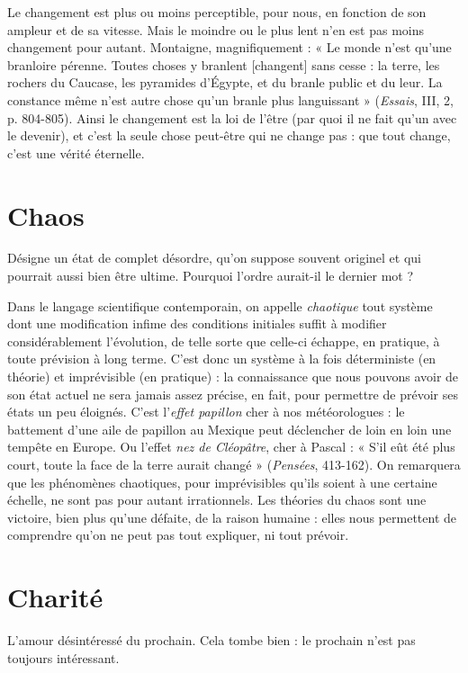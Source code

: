 Le changement est plus ou moins perceptible, pour nous, en fonction de
son ampleur et de sa vitesse. Mais le moindre ou le plus lent n’en est pas moins
changement pour autant. Montaigne, magnifiquement : « Le monde n’est
qu’une branloire pérenne. Toutes choses y branlent [changent] sans cesse : la
terre, les rochers du Caucase, les pyramides d'Égypte, et du branle public et du
leur. La constance même n’est autre chose qu’un branle plus languissant »
({\it Essais}, III, 2, p. 804-805). Ainsi le changement est la loi de l’être (par quoi il
ne fait qu’un avec le devenir), et c’est la seule chose peut-être qui ne change
pas : que tout change, c’est une vérité éternelle.

\section{Chaos}
Désigne un état de complet désordre, qu’on suppose souvent originel
et qui pourrait aussi bien être ultime. Pourquoi l’ordre aurait-il le dernier mot ?

Dans le langage scientifique contemporain, on appelle {\it chaotique} tout système
dont une modification infime des conditions initiales suffit à modifier
considérablement l’évolution, de telle sorte que celle-ci échappe, en pratique, à
toute prévision à long terme. C’est donc un système à la fois déterministe (en
théorie) et imprévisible (en pratique) : la connaissance que nous pouvons avoir
de son état actuel ne sera jamais assez précise, en fait, pour permettre de prévoir
ses états un peu éloignés. C’est l'{\it effet papillon} cher à nos météorologues : le battement
d’une aile de papillon au Mexique peut déclencher de loin en loin une
tempête en Europe. Ou l'effet {\it nez de Cléopâtre}, cher à Pascal : « S’il eût été plus
court, toute la face de la terre aurait changé » ({\it Pensées}, 413-162). On remarquera
que les phénomènes chaotiques, pour imprévisibles qu’ils soient à une
certaine échelle, ne sont pas pour autant irrationnels. Les théories du chaos sont
une victoire, bien plus qu’une défaite, de la raison humaine : elles nous permettent
de comprendre qu’on ne peut pas tout expliquer, ni tout prévoir.

\section{Charité}
L'amour désintéressé du prochain. Cela tombe bien : le prochain
n’est pas toujours intéressant.

